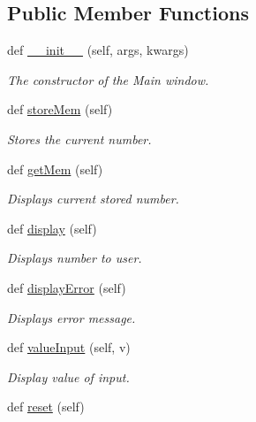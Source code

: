 \subsection*{Public Member Functions}
\begin{DoxyCompactItemize}
\item 
def \hyperlink{classmain_1_1_main_window_aafffd1d8e8955b1e04e531ad7f534b69}{\+\_\+\+\_\+init\+\_\+\+\_\+} (self, args, kwargs)
\begin{DoxyCompactList}\small\item\em The constructor of the Main window. \end{DoxyCompactList}\item 
def \hyperlink{classmain_1_1_main_window_a0888a2f2c8cd534806ea385502f1a67b}{store\+Mem} (self)
\begin{DoxyCompactList}\small\item\em Stores the current number. \end{DoxyCompactList}\item 
def \hyperlink{classmain_1_1_main_window_a77d526c3d373219cdd6d6d0437ac3660}{get\+Mem} (self)
\begin{DoxyCompactList}\small\item\em Displays current stored number. \end{DoxyCompactList}\item 
def \hyperlink{classmain_1_1_main_window_a86f6db688a227bf7a9228ef5ab650d31}{display} (self)
\begin{DoxyCompactList}\small\item\em Displays number to user. \end{DoxyCompactList}\item 
\mbox{\label{classmain_1_1_main_window_aac70ce534fc78b51649a4692bce0db0d}} 
def \hyperlink{classmain_1_1_main_window_aac70ce534fc78b51649a4692bce0db0d}{display\+Error} (self)
\begin{DoxyCompactList}\small\item\em Displays error message. \end{DoxyCompactList}\item 
def \hyperlink{classmain_1_1_main_window_a8d41e3c99603b99d23073aeea7d01534}{value\+Input} (self, v)
\begin{DoxyCompactList}\small\item\em Display value of input. \end{DoxyCompactList}\item 
def \hyperlink{classmain_1_1_main_window_a8e489d6d240a339dceb8258429fe1fc9}{reset} (self)

\end{DoxyCompactItemize}
